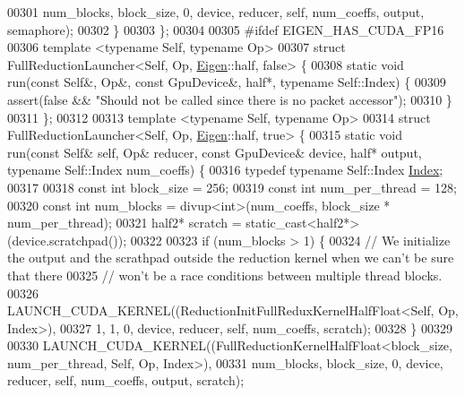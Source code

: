 \begin{DoxyCode}
00301                        num\_blocks, block\_size, 0, device, reducer, \textcolor{keyword}{self}, num\_coeffs, output, semaphore);
00302   \}
00303 \};
00304 
00305 \textcolor{preprocessor}{#ifdef EIGEN\_HAS\_CUDA\_FP16}
00306 \textcolor{keyword}{template} <\textcolor{keyword}{typename} Self, \textcolor{keyword}{typename} Op>
00307 \textcolor{keyword}{struct }FullReductionLauncher<Self, Op, \hyperlink{namespace_eigen}{Eigen}::half, false> \{
00308   \textcolor{keyword}{static} \textcolor{keywordtype}{void} run(\textcolor{keyword}{const} Self&, Op&, \textcolor{keyword}{const} GpuDevice&, half*, \textcolor{keyword}{typename} Self::Index) \{
00309     assert(\textcolor{keyword}{false} && \textcolor{stringliteral}{"Should not be called since there is no packet accessor"});
00310   \}
00311 \};
00312 
00313 \textcolor{keyword}{template} <\textcolor{keyword}{typename} Self, \textcolor{keyword}{typename} Op>
00314 \textcolor{keyword}{struct }FullReductionLauncher<Self, Op, \hyperlink{namespace_eigen}{Eigen}::half, true> \{
00315   \textcolor{keyword}{static} \textcolor{keywordtype}{void} run(\textcolor{keyword}{const} Self& \textcolor{keyword}{self}, Op& reducer, \textcolor{keyword}{const} GpuDevice& device, half* output, \textcolor{keyword}{typename} 
      Self::Index num\_coeffs) \{
00316     \textcolor{keyword}{typedef} \textcolor{keyword}{typename} Self::Index \hyperlink{namespace_eigen_a62e77e0933482dafde8fe197d9a2cfde}{Index};
00317 
00318     \textcolor{keyword}{const} \textcolor{keywordtype}{int} block\_size = 256;
00319     \textcolor{keyword}{const} \textcolor{keywordtype}{int} num\_per\_thread = 128;
00320     \textcolor{keyword}{const} \textcolor{keywordtype}{int} num\_blocks = divup<int>(num\_coeffs, block\_size * num\_per\_thread);
00321     half2* scratch = \textcolor{keyword}{static\_cast<}half2*\textcolor{keyword}{>}(device.scratchpad());
00322 
00323     \textcolor{keywordflow}{if} (num\_blocks > 1) \{
00324       \textcolor{comment}{// We initialize the output and the scrathpad outside the reduction kernel when we can't be sure that
       there}
00325       \textcolor{comment}{// won't be a race conditions between multiple thread blocks.}
00326       LAUNCH\_CUDA\_KERNEL((ReductionInitFullReduxKernelHalfFloat<Self, Op, Index>),
00327                          1, 1, 0, device, reducer, \textcolor{keyword}{self}, num\_coeffs, scratch);
00328     \}
00329 
00330     LAUNCH\_CUDA\_KERNEL((FullReductionKernelHalfFloat<block\_size, num\_per\_thread, Self, Op, Index>),
00331                        num\_blocks, block\_size, 0, device, reducer, \textcolor{keyword}{self}, num\_coeffs, output, scratch);

\end{DoxyCode}
